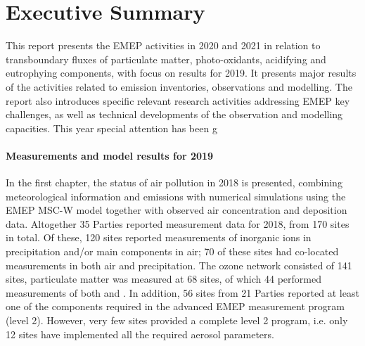 \chapter*{Executive Summary}


This report presents the EMEP activities in 2020 and 2021 in relation to transboundary
fluxes of particulate matter, photo-oxidants, acidifying and
eutrophying components, with focus on results
for 2019. It presents major results of the activities related to
emission inventories, observations and modelling. The report also
introduces specific relevant research activities addressing EMEP key
challenges, as well as technical developments of the observation and
modelling capacities. This year special attention has been g

\subsubsection*{Measurements and model results for 2019} %
In the first chapter, the status of air pollution in 2018 is presented, combining 
meteorological information and emissions with numerical simulations using the EMEP MSC-W model together with observed air concentration and deposition data.
Altogether 35 Parties reported measurement data for 2018, from 170 sites in total. 
Of these, 120 sites reported measurements of inorganic ions in precipitation and/or 
main components in air; 70 of these sites had co-located measurements in both air and 
precipitation. The ozone network consisted of 141 sites, particulate matter was measured at 
68 sites, of which 44 performed measurements of both \PM[10] and \PM[2.5]. 
In addition, 56 sites from 21 Parties reported at least one of the components required in the advanced EMEP measurement program (level 2). However, very few sites provided a complete level 2 program, i.e. only 12 sites have implemented all the required aerosol parameters. 

